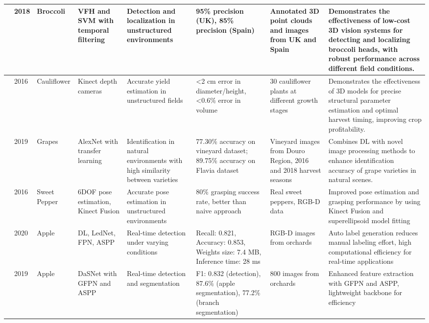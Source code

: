 \documentclass[a4paper,fleqn]{cas-dc}
\begin{document}
\begin{table}[htbp]
\begin{tabular}{@{}p{0.4cm}p{0.4cm}p{1.4cm}p{1.4cm}p{2cm}p{2cm}p{2cm}p{4.5cm}@{}}
\cite{kusumam20173d} & 2018 & Broccoli & VFH and SVM with temporal filtering & Detection and localization in unstructured environments & 95\% precision (UK), 85\% precision (Spain) & Annotated 3D point clouds and images from UK and Spain & Demonstrates the effectiveness of low-cost 3D vision systems for detecting and localizing broccoli heads, with robust performance across different field conditions. \\ \midrule
\cite{andujar2016using} & 2016 & Cauliflower & Kinect depth cameras & Accurate yield estimation in unstructured fields & <2 cm error in diameter/height, <0.6\% error in volume & 30 cauliflower plants at different growth stages & Demonstrates the effectiveness of 3D models for precise structural parameter estimation and optimal harvest timing, improving crop profitability. \\ \midrule
\cite{pereira2019deep} & 2019 & Grapes & AlexNet with transfer learning & Identification in natural environments with high similarity between varieties & 77.30\% accuracy on vineyard dataset; 89.75\% accuracy on Flavia dataset & Vineyard images from Douro Region, 2016 and 2018 harvest seasons & Combines DL with novel image processing methods to enhance identification accuracy of grape varieties in natural scenes. \\ \midrule
\cite{lehnert2016sweet} & 2016 & Sweet Pepper & 6DOF pose estimation, Kinect Fusion & Accurate pose estimation in unstructured environments & 80\% grasping success rate, better than naive approach & Real sweet peppers, RGB-D data & Improved pose estimation and grasping performance by using Kinect Fusion and superellipsoid model fitting \\ \midrule
\cite{kang2020fast} & 2020 & Apple & DL, LedNet, FPN, ASPP & Real-time detection under varying conditions & Recall: 0.821, Accuracy: 0.853, Weights size: 7.4 MB, Inference time: 28 ms & RGB-D images from orchards & Auto label generation reduces manual labeling effort, high computational efficiency for real-time applications \\ \midrule
\cite{kang2019fruit} & 2019 & Apple & DaSNet with GFPN and ASPP & Real-time detection and segmentation & F1: 0.832 (detection), 87.6\% (apple segmentation), 77.2\% (branch segmentation) & 800 images from orchards & Enhanced feature extraction with GFPN and ASPP, lightweight backbone for efficiency \\ \midrule
\end{tabular}
\end{table}
\end{document}
